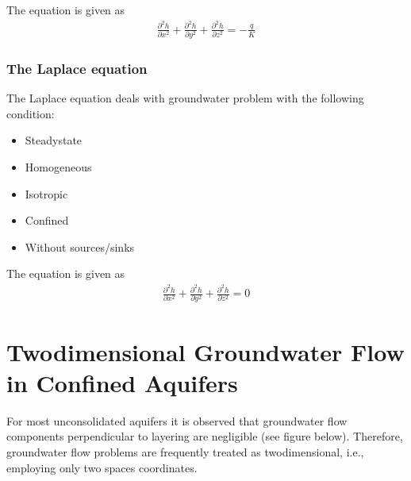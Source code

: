 \documentclass[letterpaper,10pt,english]{jupyterBook}
\begin{document}
\sphinxAtStartPar
The equation is given as
\begin{equation*}
\begin{split}
\frac{\partial^2 h }{\partial x^2} + \frac{\partial^2 h}{\partial y^2} + \frac{\partial^2 h}{\partial z^2} = -\frac{q}{K} 
\end{split}
\end{equation*}

\subsubsection{The Laplace equation}
\label{\detokenize{content/flow/L7/17_quantify_flow:the-laplace-equation}}
\sphinxAtStartPar
The Laplace equation deals with groundwater problem with the following condition:
\begin{itemize}
\item {} 
\sphinxAtStartPar
Steady\sphinxhyphen{}state

\item {} 
\sphinxAtStartPar
Homogeneous

\item {} 
\sphinxAtStartPar
Isotropic

\item {} 
\sphinxAtStartPar
Confined

\item {} 
\sphinxAtStartPar
Without sources/sinks

\end{itemize}

\sphinxAtStartPar
The equation is given as
\begin{equation*}
\begin{split}
\frac{\partial^2 h }{\partial x^2} + \frac{\partial^2 h}{\partial y^2} + \frac{\partial^2 h}{\partial z^2} = 0 
\end{split}
\end{equation*}

\section{Two\sphinxhyphen{}dimensional Groundwater Flow in Confined Aquifers}
\label{\detokenize{content/flow/L7/17_quantify_flow:two-dimensional-groundwater-flow-in-confined-aquifers}}
\sphinxAtStartPar
For most unconsolidated aquifers it is observed that groundwater flow components perpendicular to layering are negligible (see figure below). Therefore, groundwater flow problems are frequently treated as two\sphinxhyphen{}dimensional, i.e., employing only two spaces coordinates.
\end{document}
